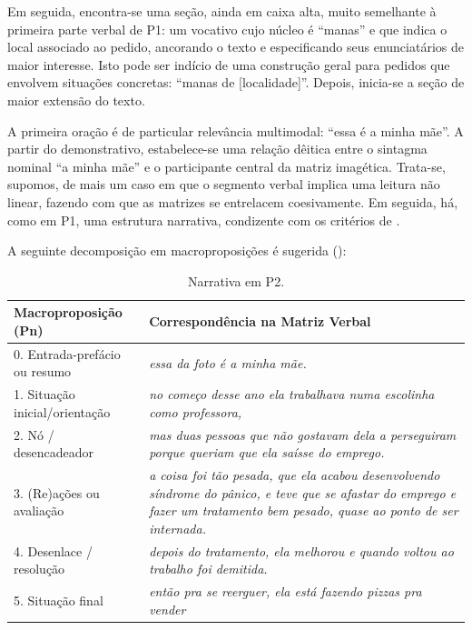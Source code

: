 \documentclass{textolivre}
\begin{document}
Em seguida, encontra-se uma seção, ainda em caixa alta, muito semelhante à primeira parte verbal de P1: um vocativo cujo núcleo é “manas” e que indica o local associado ao pedido, ancorando o texto e especificando seus enunciatários de maior interesse. Isto pode ser indício de uma construção geral para pedidos que envolvem situações concretas: “manas de [localidade]”. Depois, inicia-se a seção de maior extensão do texto.

A primeira oração é de particular relevância multimodal: “essa é a minha mãe”. A partir do demonstrativo, estabelece-se uma relação dêitica entre o sintagma nominal “a minha mãe” e o participante central da matriz imagética. Trata-se, supomos, de mais um caso em que o segmento verbal implica uma leitura não linear, fazendo com que as matrizes se entrelacem coesivamente. Em seguida, há, como em P1, uma estrutura narrativa, condizente com os critérios de \textcite{adam1992}.

A seguinte decomposição em macroproposições é sugerida ():

\begin{table}[htpb]
\caption{Narrativa em P2.}
\label{tbl-tabela-02}
\begin{tabular}{lp{}}
\toprule
Macroproposição (Pn) & Correspondência na Matriz Verbal\\
\midrule                                                                                               
0. Entrada-prefácio ou resumo  & \textit{essa da foto é a minha mãe.}\\
1. Situação inicial/orientação & \textit{no começo desse ano ela trabalhava numa escolinha como professora,}\\
2. Nó / desencadeador          & \textit{mas duas pessoas que não gostavam dela a perseguiram porque queriam que ela saísse do emprego.}\\
3. (Re)ações ou avaliação      & \textit{a coisa foi tão pesada, que ela acabou desenvolvendo síndrome do pânico, e teve que se afastar do emprego e fazer um tratamento bem pesado, quase ao ponto de ser internada.} \\
4. Desenlace / resolução       & \textit{depois do tratamento, ela melhorou e quando voltou ao trabalho foi demitida.} \\
5. Situação final              & \textit{então pra se reerguer, ela está fazendo pizzas pra vender} \\
\bottomrule
\end{tabular}
\end{table}
\end{document}

